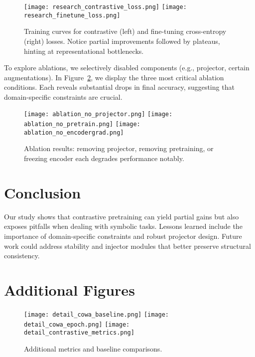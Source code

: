 \documentclass{article}
\begin{document}
\begin{figure}[t]
\centering
\texttt{[image: research\_contrastive\_loss.png]}
\texttt{[image: research\_finetune\_loss.png]}
\caption{Training curves for contrastive (left) and fine-tuning cross-entropy (right) losses. Notice partial improvements followed by plateaus, hinting at representational bottlenecks.}
\label{fig:main_training}
\end{figure}

To explore ablations, we selectively disabled components (e.g., projector, certain augmentations). In Figure~\ref{fig:ablation_main}, we display the three most critical ablation conditions. Each reveals substantial drops in final accuracy, suggesting that domain-specific constraints are crucial.

\begin{figure}[t]
\centering
\texttt{[image: ablation\_no\_projector.png]}
\texttt{[image: ablation\_no\_pretrain.png]}
\texttt{[image: ablation\_no\_encodergrad.png]}
\caption{Ablation results: removing projector, removing pretraining, or freezing encoder each degrades performance notably.}
\label{fig:ablation_main}
\end{figure}

\section{Conclusion}
Our study shows that contrastive pretraining can yield partial gains but also exposes pitfalls when dealing with symbolic tasks. Lessons learned include the importance of domain-specific constraints and robust projector design. Future work could address stability and injector modules that better preserve structural consistency.



\clearpage
\appendix

\section{Additional Figures}
\begin{figure}[h]
\centering
\texttt{[image: detail\_cowa\_baseline.png]}
\texttt{[image: detail\_cowa\_epoch.png]}
\texttt{[image: detail\_contrastive\_metrics.png]}
\caption{Additional metrics and baseline comparisons.}
\label{fig:appendix_figure1}
\end{figure}
\end{document}
